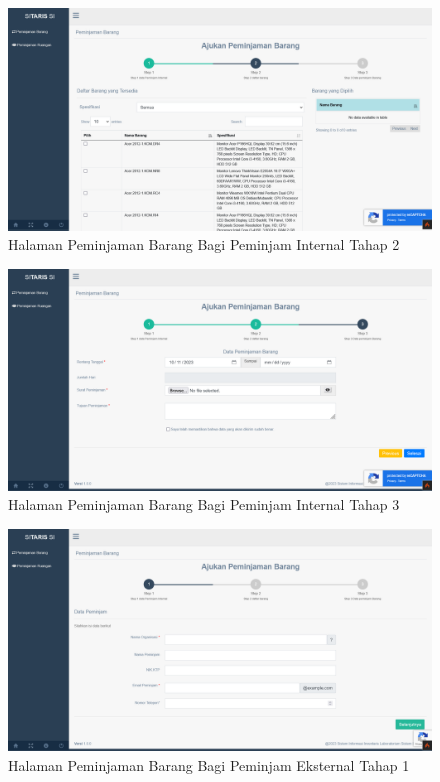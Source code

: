 \begin{enumerate}
        \begin{figure}
          \centering
          \includegraphics[width=0.82\linewidth]{konten//gambar/peminjaman barang tambah internal 2 hasil.png}
          \caption{Halaman Peminjaman Barang Bagi Peminjam Internal Tahap 2}
          \label{fig:enter-label}
        \end{figure}

        \begin{figure}
          \centering
          \includegraphics[width=0.82\linewidth]{konten//gambar/peminjaman barang tambah internal 3 hasil.png}
          \caption{Halaman Peminjaman Barang Bagi Peminjam Internal Tahap 3}
          \label{fig:enter-label}
        \end{figure}

        \begin{figure}
          \centering
          \includegraphics[width=0.82\linewidth]{konten//gambar/peminjaman barang tambah eksternal 1 hasil.png}
          \caption{Halaman Peminjaman Barang Bagi Peminjam Eksternal Tahap 1}
          \label{fig:enter-label}
        \end{figure}


\end{enumerate}

